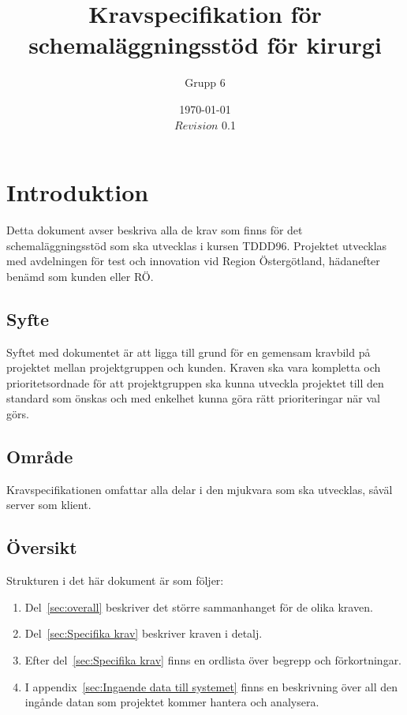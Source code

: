 \documentclass{article}
\begin{document}
\title{Kravspecifikation för schemaläggningsstöd för kirurgi}
\author{Grupp 6}
\date{\today \\ $Revision$ 0.1 }




\section{Introduktion}
Detta dokument avser beskriva alla de krav som finns för det schemaläggningsstöd
som ska utvecklas i kursen TDDD96. Projektet utvecklas med avdelningen för test
och innovation vid Region Östergötland, hädanefter benämd som kunden eller RÖ.

\subsection{Syfte}
Syftet med dokumentet är att ligga till grund för en gemensam kravbild på
projektet mellan projektgruppen och kunden. Kraven ska vara kompletta och
prioritetsordnade för att projektgruppen ska kunna utveckla projektet till den
standard som önskas och med enkelhet kunna göra rätt prioriteringar när val görs.

\subsection{Område}
Kravspecifikationen omfattar alla delar i den mjukvara som ska utvecklas, såväl
server som klient.

\subsection{Översikt}
Strukturen i det här dokument är som följer:

\begin{enumerate}
\item Del~\ref{sec:overall} beskriver det större sammanhanget för de olika
kraven.
\item Del~\ref{sec:Specifika krav} beskriver kraven i detalj.
\item Efter del~\ref{sec:Specifika krav} finns en ordlista över begrepp och
förkortningar.
\item I appendix~\ref{sec:Ingaende data till systemet} finns en beskrivning
över all den ingånde datan som projektet kommer hantera och analysera.

\end{enumerate}
\end{document}
